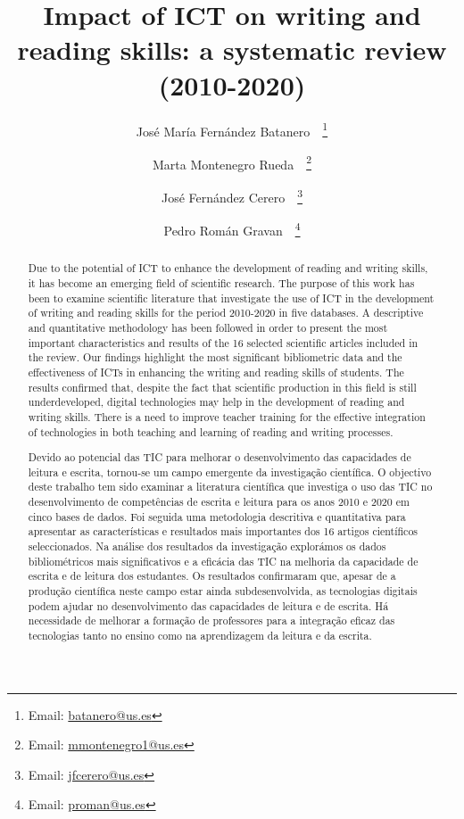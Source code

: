 \documentclass{textolivre-html}
\title{Impact of ICT on writing and reading skills: a systematic review (2010-2020)}
\author[1]{José María Fernández Batanero~\orcid{0000-0003-4097-5382}~\thanks{Email: \url{batanero@us.es}}}
\author[1]{Marta Montenegro Rueda~\orcid{0000-0003-4733-289X}~\thanks{Email: \url{mmontenegro1@us.es}}}
\author[1]{José Fernández Cerero~\orcid{0000-0002-2745-6986}~\thanks{Email: \url{jfcerero@us.es}}}
\author[1]{Pedro Román Gravan~\orcid{0000-0002-1646-9247}~\thanks{Email: \url{proman@us.es}}}
\affil[1]{Universidad de Sevilla, Facultad de Ciencias de la Educación, Departamento de Didáctica y Organización Educativa, Sevilla, España.}
\begin{document}
\maketitle

\begin{polyabstract}
\begin{abstract}
Due to the potential of ICT to enhance the development of reading and writing skills, it has become an emerging field of scientific research. The purpose of this work has been to examine scientific literature that investigate the use of ICT in the development of writing and reading skills for the period 2010-2020 in five databases. A descriptive and quantitative methodology has been followed in order to present the most important characteristics and results of the 16 selected scientific articles included in the review. Our findings highlight the most significant bibliometric data and the effectiveness of ICTs in enhancing the writing and reading skills of students. The results confirmed that, despite the fact that scientific production in this field is still underdeveloped, digital technologies may help in the development of reading and writing skills. There is a need to improve teacher training for the effective integration of technologies in both teaching and learning of reading and writing processes.

\end{abstract}

\begin{portuguese}
\begin{abstract}
Devido ao potencial das TIC para melhorar o desenvolvimento das capacidades de leitura e escrita, tornou-se um campo emergente da investigação científica. O objectivo deste trabalho tem sido examinar a literatura científica que investiga o uso das TIC no desenvolvimento de competências de escrita e leitura para os anos 2010 e 2020 em cinco bases de dados. Foi seguida uma metodologia descritiva e quantitativa para apresentar as características e resultados mais importantes dos 16 artigos científicos seleccionados. Na análise dos resultados da investigação explorámos os dados bibliométricos mais significativos e a eficácia das TIC na melhoria da capacidade de escrita e de leitura dos estudantes. Os resultados confirmaram que, apesar de a produção científica neste campo estar ainda subdesenvolvida, as tecnologias digitais podem ajudar no desenvolvimento das capacidades de leitura e de escrita. Há necessidade de melhorar a formação de professores para a integração eficaz das tecnologias tanto no ensino como na aprendizagem da leitura e da escrita.

\end{abstract}
\end{portuguese}

\end{polyabstract}
\end{document}
